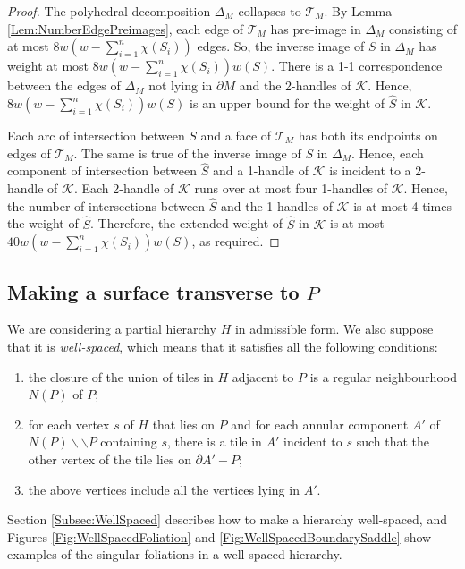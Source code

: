 \documentclass[oneside]{amsart}
\numberwithin{equation}{section}
\theoremstyle{plain}
\theoremstyle{definition}
\newcommand{\calT}{{\mathcal{T}}}
\newcommand{\cut}{\backslash\backslash}
\begin{document}
\begin{proof}
The polyhedral decomposition $\Delta_M$ collapses to $\calT_M$. By Lemma \ref{Lem:NumberEdgePreimages},
each edge of $\calT_M$ has pre-image in $\Delta_M$ consisting of at most $8w (w - \sum_{i=1}^n \chi(S_i))$
edges. So, the inverse image of $S$ in $\Delta_M$ has weight at most $8w (w - \sum_{i=1}^n \chi(S_i)) w(S)$.
There is a 1-1 correspondence between the edges of $\Delta_M$ not lying in $\partial M$ and
the 2-handles of $\mathcal{K}$. Hence, $8w (w - \sum_{i=1}^n \chi(S_i)) w(S)$ is an upper bound for
the weight of $\hat S$ in $\mathcal{K}$. 

Each arc of intersection between $S$ and a face of $\calT_M$ has both its endpoints on edges of $\calT_M$.
The same is true of the inverse image of $S$ in $\Delta_M$. Hence, each component of intersection between 
$\hat S$ and a 1-handle of $\mathcal{K}$ is incident to
a 2-handle of $\mathcal{K}$. Each 2-handle of $\mathcal{K}$ runs over at most four 1-handles of 
$\mathcal{K}$. Hence, the number of intersections between $\hat S$ and the 1-handles of $\mathcal{K}$
is at most 4 times the weight of $\hat S$. Therefore, the extended weight of $\hat S$ in $\mathcal{K}$ is at most
$40w (w - \sum_{i=1}^n \chi(S_i)) w(S)$, as required.
\end{proof}



\subsection{Making a surface transverse to $P$}
\label{Subsec:TransverseToPattern}


We are considering a partial hierarchy $H$ in admissible form. We also suppose that 
it is \emph{well-spaced}, which means that it satisfies all the following conditions:
\begin{enumerate}
\item the closure of the union of tiles in $H$ adjacent to $P$ is a regular neighbourhood $N(P)$ of $P$;
\item for each vertex $s$ of $H$ that lies on $P$ and for each annular component $A'$ of $N(P) \cut P$ containing $s$, there is a tile in $A'$ incident to $s$ such that the other vertex of the tile lies on $\partial A' - P$;
\item the above vertices include all the vertices lying in $A'$.
\end{enumerate}
Section \ref{Subsec:WellSpaced} describes how to make a hierarchy well-spaced, and Figures \ref{Fig:WellSpacedFoliation} and \ref{Fig:WellSpacedBoundarySaddle} show examples
of the singular foliations in a well-spaced hierarchy.
\end{document}
